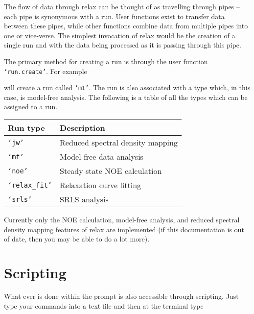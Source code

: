The flow of data through relax can be thought of as travelling through pipes -- each pipe is synonymous with a run.  User functions  exist to transfer data between these pipes, while other functions combine data from multiple pipes into one or vice-verse.  The simplest invocation of relax would be the creation of a single run and with the data being processed as it is passing through this pipe.

The primary method for creating a run is through the user function  \texttt{`run.create'}.  For example


will create a run called \texttt{`m1'}.  The run is also associated with a type which, in this case, is model-free analysis.  The following is a table of all the types which can be assigned to a run.

\begin{center}
\begin{tabular}{ll}
\toprule

Run type                & Description \\

\midrule

\texttt{`jw'}           & Reduced spectral density mapping \\
\texttt{`mf'}           & Model-free data analysis \\
\texttt{`noe'}          & Steady state NOE calculation \\
\texttt{`relax\_fit'}   & Relaxation curve fitting \\
\texttt{`srls'}         & SRLS analysis \\

\bottomrule
\end{tabular}
\end{center}

Currently only the NOE calculation, model-free analysis, and reduced spectral density mapping features of relax are implemented (if this documentation is out of date, then you may be able to do a lot more). 




\section{Scripting}

What ever is done within the prompt is also accessible through scripting.  Just type your commands into a text file and then at the terminal type

